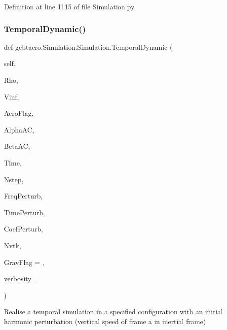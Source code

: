 Definition at line 1115 of file Simulation.\+py.

\mbox{\label{classgebtaero_1_1_simulation_1_1_simulation_abcfba8fd89bc92734326085c272134ae}} 
\subsubsection{\texorpdfstring{Temporal\+Dynamic()}{TemporalDynamic()}}
{\footnotesize\ttfamily def gebtaero.\+Simulation.\+Simulation.\+Temporal\+Dynamic (\begin{DoxyParamCaption}\item[{}]{self,  }\item[{}]{Rho,  }\item[{}]{Vinf,  }\item[{}]{Aero\+Flag,  }\item[{}]{Alpha\+AC,  }\item[{}]{Beta\+AC,  }\item[{}]{Time,  }\item[{}]{Nstep,  }\item[{}]{Freq\+Perturb,  }\item[{}]{Time\+Perturb,  }\item[{}]{Coef\+Perturb,  }\item[{}]{Nvtk,  }\item[{}]{Grav\+Flag = {},  }\item[{}]{verbosity = {} }\end{DoxyParamCaption})}



Realise a temporal simulation in a specified configuration with an initial harmonic perturbation (vertical speed of frame a in inertial frame) 


